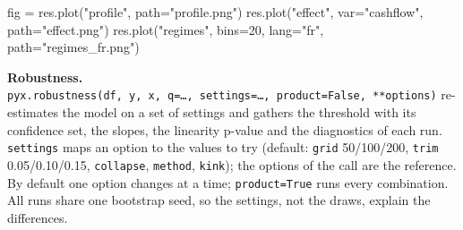 \documentclass[
  10.5pt,
  a4paper,
]{article}
\newenvironment{Shaded}{}{}
\newcommand{\DecValTok}[1]{\textcolor[rgb]{0.25,0.63,0.44}{#1}}
\newcommand{\NormalTok}[1]{#1}
\newcommand{\OperatorTok}[1]{\textcolor[rgb]{0.40,0.40,0.40}{#1}}
\newcommand{\StringTok}[1]{\textcolor[rgb]{0.25,0.44,0.63}{#1}}
\begin{document}
\begin{Shaded}
\begin{Highlighting}[]
\NormalTok{fig }\OperatorTok{=}\NormalTok{ res.plot(}\StringTok{"profile"}\NormalTok{, path}\OperatorTok{=}\StringTok{"profile.png"}\NormalTok{)}
\NormalTok{res.plot(}\StringTok{"effect"}\NormalTok{, var}\OperatorTok{=}\StringTok{"cashflow"}\NormalTok{, path}\OperatorTok{=}\StringTok{"effect.png"}\NormalTok{)}
\NormalTok{res.plot(}\StringTok{"regimes"}\NormalTok{, bins}\OperatorTok{=}\DecValTok{20}\NormalTok{, lang}\OperatorTok{=}\StringTok{"fr"}\NormalTok{, path}\OperatorTok{=}\StringTok{"regimes\_fr.png"}\NormalTok{)}
\end{Highlighting}
\end{Shaded}

\textbf{Robustness.}
\texttt{pyx.robustness(df,\ y,\ x,\ q=…,\ settings=…,\ product=False,\ **options)}
re-estimates the model on a set of settings and gathers the threshold
with its confidence set, the slopes, the linearity p-value and the
diagnostics of each run. \texttt{settings} maps an option to the values
to try (default: \texttt{grid} 50/100/200, \texttt{trim} 0.05/0.10/0.15,
\texttt{collapse}, \texttt{method}, \texttt{kink}); the options of the
call are the reference. By default one option changes at a time;
\texttt{product=True} runs every combination. All runs share one
bootstrap seed, so the settings, not the draws, explain the differences.
\end{document}
